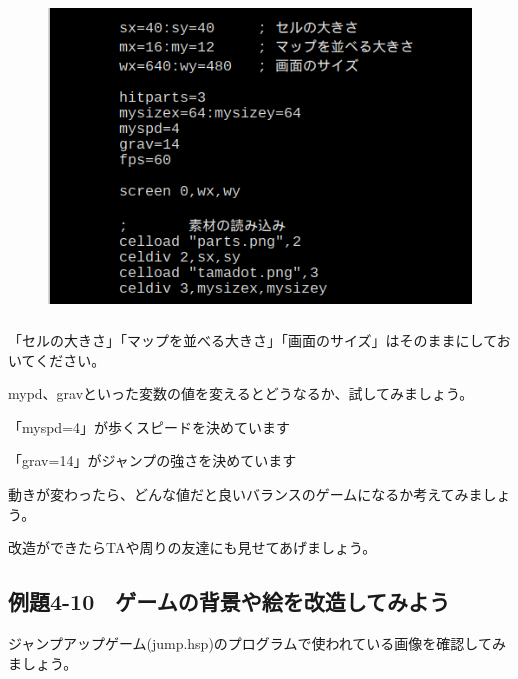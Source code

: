 \begin{figure}[H]
    \begin{center}
      \includegraphics[keepaspectratio,width=11.853cm,height=8.266cm]{text04-img/s_jumpsrcpart.png}
    \end{center}
    \label{fig:prog_menu}
\end{figure}


「セルの大きさ」「マップを並べる大きさ」「画面のサイズ」はそのままにしておいてください。

mypd、gravといった変数の値を変えるとどうなるか、試してみましょう。

\begin{description}
    \item {}
\end{description}

「myspd=4」が歩くスピードを決めています

「grav=14」がジャンプの強さを決めています

動きが変わったら、どんな値だと良いバランスのゲームになるか考えてみましょう。

改造ができたらTAや周りの友達にも見せてあげましょう。


\newpage
\subsection{例題4-10　ゲームの背景や絵を改造してみよう}


\begin{description}
    \item {}
\end{description}

ジャンプアップゲーム(jump.hsp)のプログラムで使われている画像を確認してみましょう。

